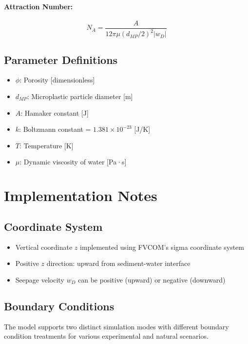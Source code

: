 \documentclass[11pt,a4paper]{article}
\begin{document}
\paragraph{Attraction Number:}
\begin{equation}
N_A = \frac{A}{12\pi\mu(d_{MP}/2)^2|w_D|}
\end{equation}

\subsection{Parameter Definitions}

\begin{itemize}
    \item $\phi$: Porosity [dimensionless]
    \item $d_{MP}$: Microplastic particle diameter [m]
    \item $A$: Hamaker constant [J]
    \item $k$: Boltzmann constant = $1.381 \times 10^{-23}$ [J/K]
    \item $T$: Temperature [K]
    \item $\mu$: Dynamic viscosity of water [Pa·s]
\end{itemize}

\section{Implementation Notes}

\subsection{Coordinate System}
\begin{itemize}
    \item Vertical coordinate $z$ implemented using FVCOM's sigma coordinate system
    \item Positive $z$ direction: upward from sediment-water interface
    \item Seepage velocity $w_D$ can be positive (upward) or negative (downward)
\end{itemize}

\subsection{Boundary Conditions}

The model supports two distinct simulation modes with different boundary condition treatments for various experimental and natural scenarios.
\end{document}
